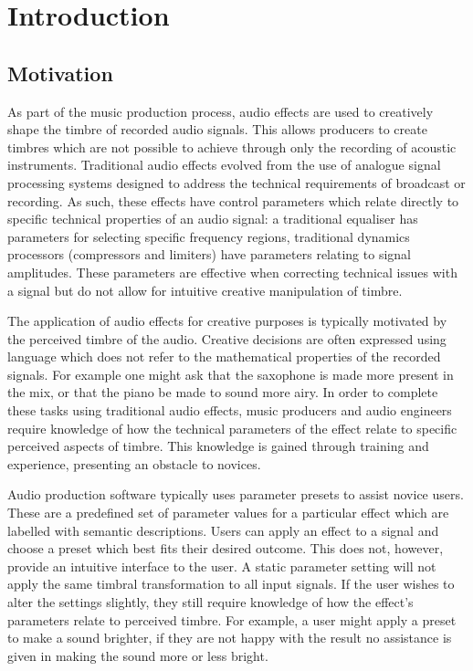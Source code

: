\chapter{Introduction}
\label{chap:Introduction}

\section{Motivation}
\label{sec:Introduction-Motivation}
	As part of the music production process, audio effects are used to creatively shape the timbre of recorded audio
	signals. This allows producers to create timbres which are not possible to achieve through only the recording of
	acoustic instruments. Traditional audio effects evolved from the use of analogue signal processing systems
	designed to address the technical requirements of broadcast or recording. As such, these effects have control
	parameters which relate directly to specific technical properties of an audio signal: a traditional equaliser has
	parameters for selecting specific frequency regions, traditional dynamics processors (compressors and limiters) have
	parameters relating to signal amplitudes. These parameters are effective when correcting technical issues with a
	signal but do not allow for intuitive creative manipulation of timbre.

	The application of audio effects for creative purposes is typically motivated by the perceived timbre of the audio.
	Creative decisions are often expressed using language which does not refer to the mathematical properties of the
	recorded signals. For example one might ask that the saxophone is made more present in the mix, or that the piano be
	made to sound more airy. In order to complete these tasks using traditional audio effects, music producers and audio
	engineers require knowledge of how the technical parameters of the effect relate to specific perceived aspects of
	timbre. This knowledge is gained through training and experience, presenting an obstacle to novices.

	Audio production software typically uses parameter presets to assist novice users. These are a predefined set of
	parameter values for a particular effect which are labelled with semantic descriptions. Users can apply an effect to
	a signal and choose a preset which best fits their desired outcome. This does not, however, provide an intuitive
	interface to the user. A static parameter setting will not apply the same timbral transformation to all input
	signals. If the user wishes to alter the settings slightly, they still require knowledge of how the effect's
	parameters relate to perceived timbre. For example, a user might apply a preset to make a sound brighter, if they
	are not happy with the result no assistance is given in making the sound more or less bright.

